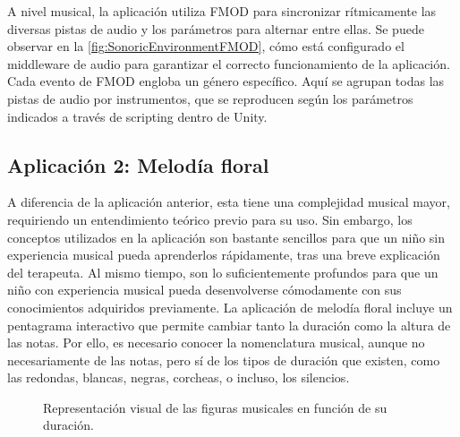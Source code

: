 A nivel musical, la aplicación utiliza FMOD para sincronizar rítmicamente las diversas pistas de audio y los parámetros para alternar entre ellas. Se puede observar en la \autoref{fig:SonoricEnvironmentFMOD}, cómo está configurado el middleware de audio para garantizar el correcto funcionamiento de la aplicación. Cada evento de FMOD engloba un género específico. Aquí se agrupan todas las pistas de audio por instrumentos, que se reproducen según los parámetros indicados a través de scripting dentro de Unity.

\subsection{Aplicación 2: Melodía floral}

A diferencia de la aplicación anterior, esta tiene una complejidad musical mayor, requiriendo un entendimiento teórico previo para su uso. Sin embargo, los conceptos utilizados en la aplicación son bastante sencillos para que un niño sin experiencia musical pueda aprenderlos rápidamente, tras una breve explicación del terapeuta. Al mismo tiempo, son lo suficientemente profundos para que un niño con experiencia musical pueda desenvolverse cómodamente con sus conocimientos adquiridos previamente. La aplicación de melodía floral incluye un pentagrama interactivo que permite cambiar tanto la duración como la altura de las notas. Por ello, es necesario conocer la nomenclatura musical, aunque no necesariamente de las notas, pero sí de los tipos de duración que existen, como las redondas, blancas, negras, corcheas, o incluso, los silencios.

\begin{figure}[h!]
	\centering
	\caption{Representación visual de las figuras musicales en función de su duración.}
	\label{fig:FloralMelodyNotes}
	\vspace{-30pt}
\end{figure}


